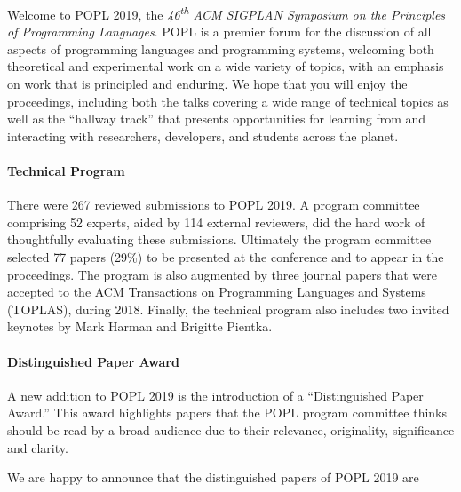 \label{Preface}


\newcommand\person[1]{{#1}}

\noindent

Welcome to POPL 2019, the
\emph{46\textsuperscript{th} ACM SIGPLAN Symposium
on the Principles of Programming Languages}.
%
POPL is a premier forum for the discussion of all aspects
of programming languages and programming systems, welcoming
both theoretical and experimental work on a wide variety of
topics, with an emphasis on work that is principled and enduring.
%
We hope that you will enjoy the proceedings,
including both the talks covering a wide range
of technical topics as well as the ``hallway track''
that presents opportunities for learning from
and interacting with researchers, developers,
and students across the planet.


\paragraph{Technical Program}
%
There were 267 reviewed submissions to POPL 2019.
%
A program committee comprising 52 experts,
aided by 114 external reviewers, did the hard work of
thoughtfully evaluating these submissions.
%
Ultimately the program committee selected 77 papers (29\%)
to be presented at the conference and to appear in the
proceedings. 
%
The program is also augmented by three journal papers that were accepted to
the ACM Transactions on Programming Languages and Systems (TOPLAS), during
2018.
%
Finally, the technical program also includes two invited keynotes by Mark Harman
and Brigitte Pientka.


\paragraph{Distinguished Paper Award}

A new addition to POPL 2019 is the introduction of a ``Distinguished Paper
Award.'' This award highlights papers that the POPL program committee thinks
should be read by a broad audience due to their relevance, originality,
significance and clarity. 

We are happy to announce that the distinguished papers of POPL 2019 are

